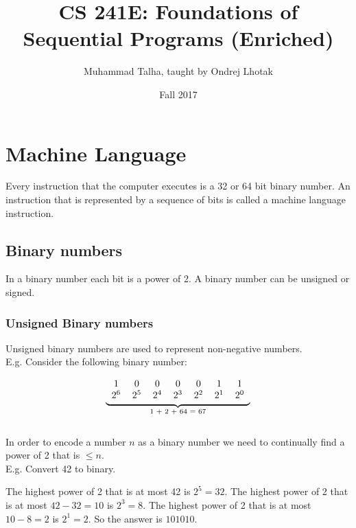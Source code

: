 \documentclass[12pt, letterpaper]{article}
\begin{document}
\title{CS 241E: Foundations of Sequential Programs (Enriched)}
\author{Muhammad Talha, taught by Ondrej Lhotak }
\date{Fall 2017}

\maketitle

\tableofcontents

\newpage

\section{Machine Language}
Every instruction that the computer executes is a 32 or 64 bit binary number. An instruction that is represented by a sequence of bits is called a machine language instruction.

\subsection{Binary numbers}
In a binary number each bit is a power of 2. A binary number can be unsigned or signed.

\subsubsection{Unsigned Binary numbers}
Unsigned binary numbers are used to represent non-negative numbers. \\

E.g. Consider the following binary number:

\[
\underbrace{
\begin{tabular}{c c c c c c c}
	1 & 0 & 0 & 0 & 0 & 1 & 1 \\
	$2^6$ & $2^5$ & $2^4$ & $2^3$ & $2^2$ & $2^1$ & $2^0$
\end{tabular}
}_\text{1 + 2 + 64 = 67}
\]\\

In order to encode a number \(n\) as a binary number we need to continually find a power of 2 that is \(\leq n\).\\

E.g. Convert 42 to binary.

The highest power of 2 that is at most 42 is \(2^5 = 32\).
The highest power of 2 that is at most \(42 - 32 = 10\) is \(2^3 = 8\).
The highest power of 2 that is at most \(10 - 8 = 2\) is \(2^1 = 2\).
So the answer is \(1 0 1 0 1 0\).\\
\end{document}

